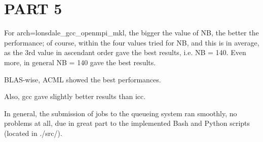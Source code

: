 \documentclass[paper=a4, fontsize=11pt]{scrartcl} %
\numberwithin{equation}{section} %
\numberwithin{figure}{section} %
\numberwithin{table}{section} %
\begin{document}
\section{PART 5}


For arch=lonsdale\_gcc\_openmpi\_mkl, the bigger the value of NB, the better the performance; of course, within the four values tried for NB, and this is in average, as the 3rd value in ascendant order gave the best results, i.e. NB = 140. Even more, in general NB = 140 gave the best results.

BLAS-wise, ACML showed the best performances.

Also, gcc gave slightly better results than icc.

In general, the submission of jobs to the queueing system ran smoothly, no problems at all, due in great part to the implemented Bash and Python scripts (located in ./src/).
\end{document}

